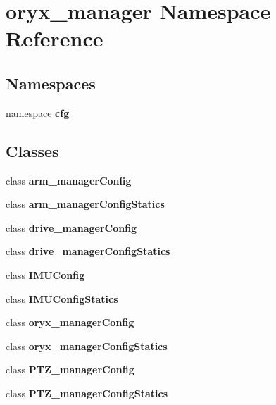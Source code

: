 \section{oryx\-\_\-manager \-Namespace \-Reference}
\label{namespaceoryx__manager}
\subsection*{\-Namespaces}
\begin{DoxyCompactItemize}
\item 
namespace {\bf cfg}
\end{DoxyCompactItemize}
\subsection*{\-Classes}
\begin{DoxyCompactItemize}
\item 
class {\bf arm\-\_\-manager\-Config}
\item 
class {\bf arm\-\_\-manager\-Config\-Statics}
\item 
class {\bf drive\-\_\-manager\-Config}
\item 
class {\bf drive\-\_\-manager\-Config\-Statics}
\item 
class {\bf \-I\-M\-U\-Config}
\item 
class {\bf \-I\-M\-U\-Config\-Statics}
\item 
class {\bf oryx\-\_\-manager\-Config}
\item 
class {\bf oryx\-\_\-manager\-Config\-Statics}
\item 
class {\bf \-P\-T\-Z\-\_\-manager\-Config}
\item 
class {\bf \-P\-T\-Z\-\_\-manager\-Config\-Statics}
\end{DoxyCompactItemize}

